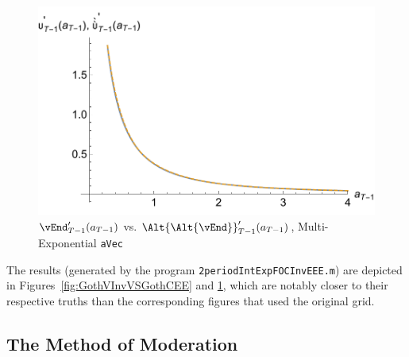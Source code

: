 \documentclass[titlepage]{\econtex}
\begin{document}
\hypertarget{GothVVSGothCInvEEE}{}
\begin{figure}
        \includegraphics{./Figures/GothVVSGothCInvEEE}
        \caption{$\vEnd_{T-1}^{\prime}({a}_{T-1})$ vs.
        $\Alt{\Alt{\vEnd}}_{T-1}^{\prime}({a}_{T-1})$, Multi-Exponential \texttt{aVec}}
        \label{fig:GothVVSGothCInvEE}
\end{figure}

The results (generated by the program \texttt{2periodIntExpFOCInvEEE.m})
are depicted in Figures~\ref{fig:GothVInvVSGothCEE} and
\ref{fig:GothVVSGothCInvEE}, which are notably closer to their
respective truths than the corresponding figures that used the original
grid.

\hypertarget{The-Method-of-Moderation}{}
\subsection{The Method of Moderation}
\end{document}
